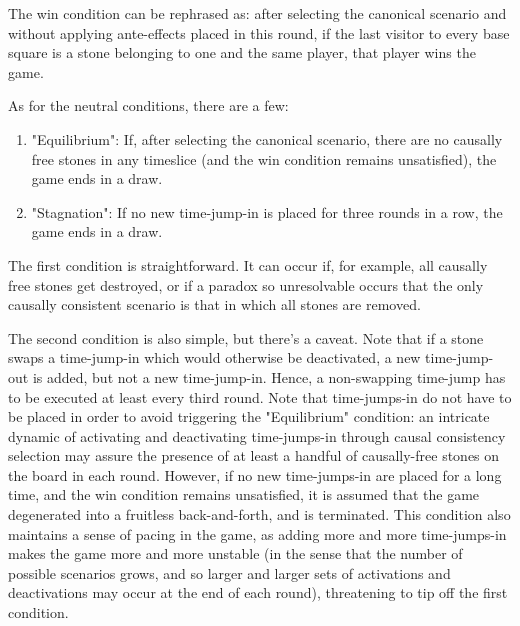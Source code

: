 \documentclass[12pt]{article}
\begin{document}
	The win condition can be rephrased as: after selecting the canonical scenario and without applying ante-effects placed in this round, if the last visitor to every base square is a stone belonging to one and the same player, that player wins the game.
	
	As for the neutral conditions, there are a few:
	\begin{enumerate}
		\item "Equilibrium": If, after selecting the canonical scenario, there are no causally free stones in any timeslice (and the win condition remains unsatisfied), the game ends in a draw.
		\item "Stagnation": If no new time-jump-in is placed for three rounds in a row, the game ends in a draw.
	\end{enumerate}
	
	The first condition is straightforward. It can occur if, for example, all causally free stones get destroyed, or if a paradox so unresolvable occurs that the only causally consistent scenario is that in which all stones are removed.

The second condition is also simple, but there's a caveat. Note that if a stone swaps a time-jump-in which would otherwise be deactivated, a new time-jump-out is added, but not a new time-jump-in. Hence, a non-swapping time-jump has to be executed at least every third round. Note that time-jumps-in do not have to be placed in order to avoid triggering the "Equilibrium" condition: an intricate dynamic of activating and deactivating time-jumps-in through causal consistency selection may assure the presence of at least a handful of causally-free stones on the board in each round. However, if no new time-jumps-in are placed for a long time, and the win condition remains unsatisfied, it is assumed that the game degenerated into a fruitless back-and-forth, and is terminated. This condition also maintains a sense of pacing in the game, as adding more and more time-jumps-in makes the game more and more unstable (in the sense that the number of possible scenarios grows, and so larger and larger sets of activations and deactivations may occur at the end of each round), threatening to tip off the first condition.
	
	
\end{document}
